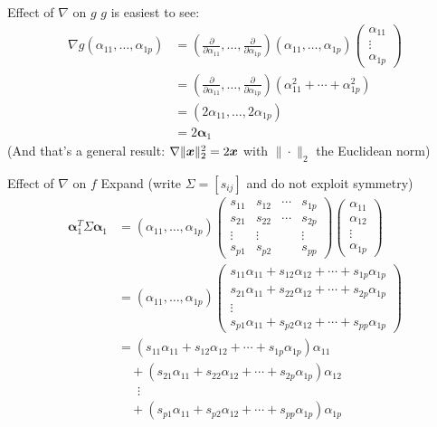 \documentclass[aspectratio=169]{beamer}\usepackage[]{graphicx}\usepackage[]{xcolor}
\begin{document}
\begin{frame}{Effect of $\nabla$ on $g$}
$g$ is easiest to see:
\begin{align*}
\nabla g(\alpha_{11},\ldots,\alpha_{1p}) &=
\left(
\frac{\partial}{\partial \alpha_{11}},
\ldots,
\frac{\partial}{\partial \alpha_{1p}}
\right) (\alpha_{11},\ldots,\alpha_{1p}) 
\begin{pmatrix}
\alpha_{11}\\ \vdots\\ \alpha_{1p}
\end{pmatrix} \\
&= \left(
\frac{\partial}{\partial \alpha_{11}},
\ldots,
\frac{\partial}{\partial \alpha_{1p}}
\right) 
\left(
\alpha_{11}^2+\cdots+\alpha_{1p}^2
\right) \\
&= \left(2\alpha_{11},\ldots,2\alpha_{1p}\right)\\
&= 2\bm{\alpha}_1
\end{align*}
\vfill
(And that's a general result: $\nabla\|\bm{x}\|_2^2=2\bm{x}$ with $\|\cdot\|_2$ the Euclidean norm)
\end{frame}

\begin{frame}{Effect of $\nabla$ on $f$}
Expand (write $\Sigma=[s_{ij}]$ and do not exploit symmetry)
\begin{align*}
\bm{\alpha}_1^T\Sigma\bm{\alpha}_1 &=
\left(\alpha_{11},\ldots,\alpha_{1p}\right)
\begin{pmatrix}
s_{11} & s_{12} & \cdots & s_{1p} \\
s_{21} & s_{22} & \cdots & s_{2p} \\
\vdots & \vdots & & \vdots \\
s_{p1} & s_{p2} & & s_{pp}
\end{pmatrix}
\begin{pmatrix}
\alpha_{11} \\ \alpha_{12} \\ \vdots \\ \alpha_{1p}
\end{pmatrix} \\
&=
\left(\alpha_{11},\ldots,\alpha_{1p}\right)
\begin{pmatrix}
s_{11}\alpha_{11}+s_{12}\alpha_{12}+\cdots+s_{1p}\alpha_{1p} \\
s_{21}\alpha_{11}+s_{22}\alpha_{12}+\cdots+s_{2p}\alpha_{1p} \\
\vdots \\
s_{p1}\alpha_{11}+s_{p2}\alpha_{12}+\cdots+s_{pp}\alpha_{1p}
\end{pmatrix} \\
&=
(s_{11}\alpha_{11}+s_{12}\alpha_{12}+\cdots+s_{1p}\alpha_{1p})\alpha_{11} \\
&\quad +
(s_{21}\alpha_{11}+s_{22}\alpha_{12}+\cdots+s_{2p}\alpha_{1p})\alpha_{12} \\
&\quad\;\;\vdots \\
&\quad +
(s_{p1}\alpha_{11}+s_{p2}\alpha_{12}+\cdots+s_{pp}\alpha_{1p})\alpha_{1p}
\end{align*}
\end{frame}
\end{document}
